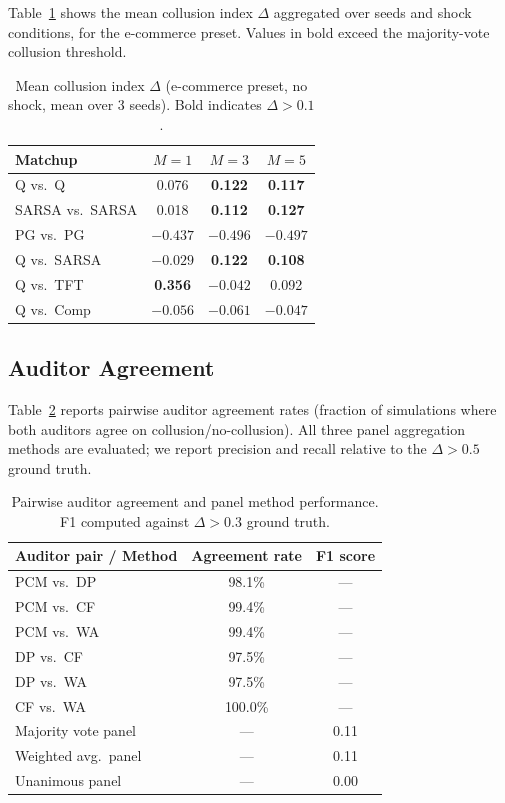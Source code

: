 \documentclass[11pt]{article}
\begin{document}
Table~\ref{tab:heatmap} shows the mean collusion index $\Delta$ aggregated over seeds and shock conditions, for the e-commerce preset.
Values in bold exceed the majority-vote collusion threshold.

\begin{table}[h]
\centering
\small
\caption{Mean collusion index $\Delta$ (e-commerce preset, no shock, mean over 3 seeds). Bold indicates $\Delta > 0.1$.}
\label{tab:heatmap}
\begin{tabular}{lccc}
\toprule
\textbf{Matchup} & \textbf{$M=1$} & \textbf{$M=3$} & \textbf{$M=5$} \\
\midrule
Q vs.\ Q       & 0.076 & \textbf{0.122} & \textbf{0.117} \\
SARSA vs.\ SARSA & 0.018 & \textbf{0.112} & \textbf{0.127} \\
PG vs.\ PG     & $-0.437$ & $-0.496$ & $-0.497$ \\
Q vs.\ SARSA   & $-0.029$ & \textbf{0.122} & \textbf{0.108} \\
Q vs.\ TFT     & \textbf{0.356} & $-0.042$ & 0.092 \\
Q vs.\ Comp    & $-0.056$ & $-0.061$ & $-0.047$ \\
\bottomrule
\end{tabular}
\end{table}

\subsection{Auditor Agreement}

Table~\ref{tab:agreement} reports pairwise auditor agreement rates (fraction of simulations where both auditors agree on collusion/no-collusion).
All three panel aggregation methods are evaluated; we report precision and recall relative to the $\Delta > 0.5$ ground truth.

\begin{table}[h]
\centering
\small
\caption{Pairwise auditor agreement and panel method performance. F1 computed against $\Delta > 0.3$ ground truth.}
\label{tab:agreement}
\begin{tabular}{lcc}
\toprule
\textbf{Auditor pair / Method} & \textbf{Agreement rate} & \textbf{F1 score} \\
\midrule
PCM vs.\ DP         & 98.1\% & --- \\
PCM vs.\ CF         & 99.4\% & --- \\
PCM vs.\ WA         & 99.4\% & --- \\
DP vs.\ CF          & 97.5\% & --- \\
DP vs.\ WA          & 97.5\% & --- \\
CF vs.\ WA          & 100.0\% & --- \\
\midrule
Majority vote panel  & --- & 0.11 \\
Weighted avg.\ panel & --- & 0.11 \\
Unanimous panel      & --- & 0.00 \\
\bottomrule
\end{tabular}
\end{table}
\end{document}
